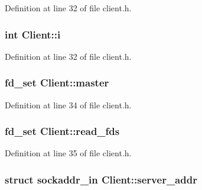 Definition at line 32 of file client.\+h.

\subsubsection[{\texorpdfstring{i}{i}}]{\setlength{\rightskip}{0pt plus 5cm}int Client\+::i\hspace{0.3cm}{\ttfamily [private]}}\hypertarget{class_client_a8086f64d20f268817ef23bc81cbea059}{}\label{class_client_a8086f64d20f268817ef23bc81cbea059}


Definition at line 32 of file client.\+h.

\subsubsection[{\texorpdfstring{master}{master}}]{\setlength{\rightskip}{0pt plus 5cm}fd\+\_\+set Client\+::master\hspace{0.3cm}{\ttfamily [private]}}\hypertarget{class_client_a56c611a99e0ba2a2efaddeb9ae021618}{}\label{class_client_a56c611a99e0ba2a2efaddeb9ae021618}


Definition at line 34 of file client.\+h.

\subsubsection[{\texorpdfstring{read\+\_\+fds}{read_fds}}]{\setlength{\rightskip}{0pt plus 5cm}fd\+\_\+set Client\+::read\+\_\+fds\hspace{0.3cm}{\ttfamily [private]}}\hypertarget{class_client_a3631a848d923649af981576df2c83506}{}\label{class_client_a3631a848d923649af981576df2c83506}


Definition at line 35 of file client.\+h.

\subsubsection[{\texorpdfstring{server\+\_\+addr}{server_addr}}]{\setlength{\rightskip}{0pt plus 5cm}struct sockaddr\+\_\+in Client\+::server\+\_\+addr\hspace{0.3cm}{\ttfamily [private]}}\hypertarget{class_client_a3787f155329f63a3bae120e9deca92d6}{}\label{class_client_a3787f155329f63a3bae120e9deca92d6}


